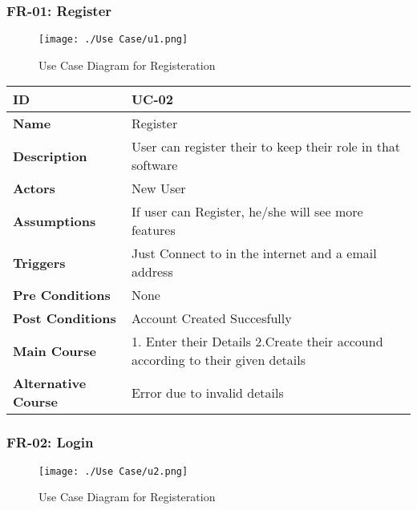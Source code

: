 
  
  \subsubsection{FR-01: Register}
    \begin{figure}[H]
    \texttt{[image: ./Use Case/u1.png]}
    \centering 
    \caption{Use Case Diagram for Registeration}
    \label{fig:prototype1}
    \end{figure}
    
    \begin{center}
        \begin{tabularx}{\textwidth}{|l|X|}
            \hline
            \textbf{ID} & UC-02 \\
            \hline
            \textbf{Name} & Register \\
            \hline
            \textbf{Description} & User can register their to keep their role in that software \\
            \hline
            \textbf{Actors} & New User \\
            \hline
            \textbf{Assumptions} & If user can Register, he/she will see more features \\
            \hline
            \textbf{Triggers} & Just Connect to in the internet and a email address \\
            \hline
            \textbf{Pre Conditions} & None \\
            \hline
            \textbf{Post Conditions} & Account Created Succesfully \\
            \hline
            \textbf{Main Course} & 1. Enter their Details 2.Create their accound according to their given details \\
            \hline
            \textbf{Alternative Course} & Error due to invalid details \\
            \hline
            
        \end{tabularx}
    \end{center}
    \newpage
    

    \subsubsection{FR-02: Login}
    \begin{figure}[H]
        \texttt{[image: ./Use Case/u2.png]}
        \centering 
        \caption{Use Case Diagram for Registeration}
        \label{fig:prototype1}
        \end{figure}
        
